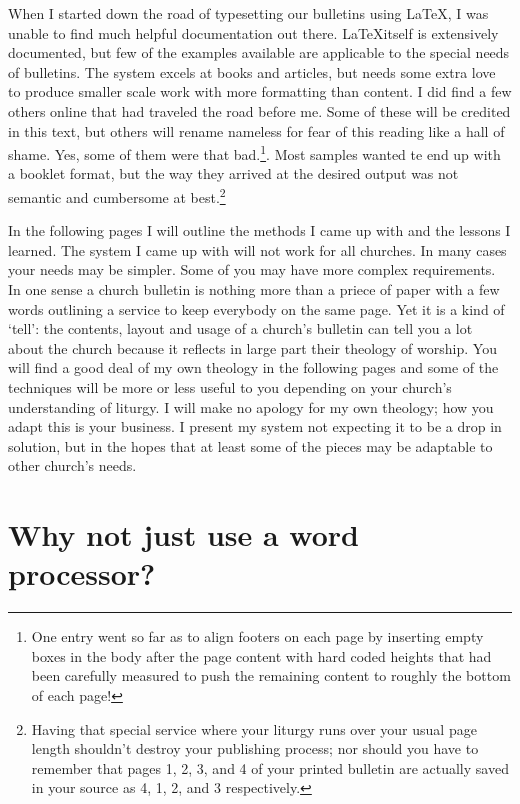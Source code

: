 \documentclass[12pt]{scrartcl}
\begin{document}
When I started down the road of typesetting our bulletins using \LaTeX, I was
unable to find much helpful documentation out there. \LaTeX itself is
extensively documented, but few of the examples available are applicable to the
special needs of bulletins. The system excels at books and articles, but needs
some extra love to produce smaller scale work with more formatting than content.
I did find a few others online that had traveled the road before me. Some of
these will be credited in this text, but others will rename nameless for fear of
this reading like a hall of shame. Yes, some of them were that bad.\footnote{One
	entry went so far as to align footers on each page by inserting empty
	boxes in the body after the page content with hard coded heights that
	had been carefully measured to push the remaining content to roughly the
	bottom of each page!}. Most samples wanted te end up with a booklet
format, but the way they arrived at the desired output was not semantic and
cumbersome at best.\footnote{Having that special service where your liturgy runs
	over your usual page length shouldn't destroy your publishing process;
	nor should you have to remember that pages 1, 2, 3, and 4 of your
	printed bulletin are actually saved in your source as 4, 1, 2, and 3
	respectively.}

In the following pages I will outline the methods I came up with and the lessons
I learned. The system I came up with will not work for all churches. In many
cases your needs may be simpler. Some of you may have more complex requirements.
In one sense a church bulletin is nothing more than a priece of paper with a few
words outlining a service to keep everybody on the same page. Yet it is a kind
of `tell': the contents, layout and usage of a church's bulletin can tell you a
lot about the church because it reflects in large part their theology of
worship. You will find a good deal of my own theology in the following pages and
some of the techniques will be more or less useful to you depending on your
church's understanding of liturgy. I will make no apology for my own theology;
how you adapt this is your business. I present my system not expecting it to be
a drop in solution, but in the hopes that at least some of the pieces may be
adaptable to other church's needs.

\tableofcontents


\section{Why not just use a word processor?}
\end{document}

